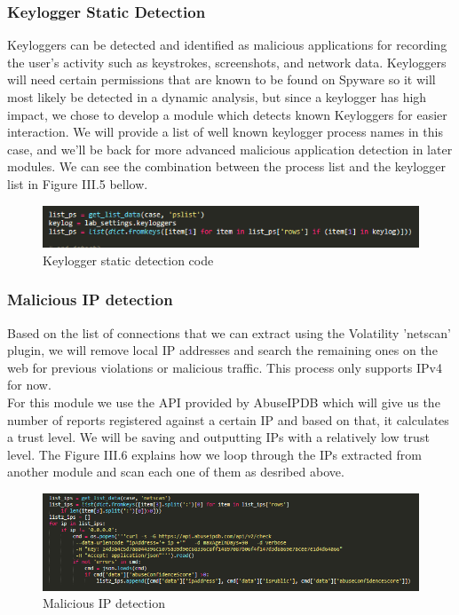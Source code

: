 \subsubsection{Keylogger Static Detection}
Keyloggers can be detected and identified as malicious applications for recording the user's activity such as keystrokes, screenshots, and network data. Keyloggers will need certain permissions that are known to be found on Spyware so it will most likely be detected in a dynamic analysis, but since a keylogger has high impact, we chose to develop a module which detects known Keyloggers for easier interaction. We will provide a list of well known keylogger process names in this case, and we'll be back for more advanced malicious application detection in later modules. We can see the combination between the process list and the keylogger list in Figure III.5 bellow.
\begin{figure}[H]
\centering
\includegraphics[width=0.8\columnwidth]{Figures/keyloggers.png}
\caption{Keylogger static detection code}
\end{figure}

\subsubsection{Malicious IP detection}
Based on the list of connections that we can extract using the Volatility 'netscan' plugin, we will remove local IP addresses and search the remaining ones on the web for previous violations or malicious traffic. This process only supports IPv4 for now.\\
For this module we use the API provided by AbuseIPDB\cite{abuseip} which will give us the number of reports registered against a certain IP and based on that, it calculates a trust level. We will be saving and outputting IPs with a relatively low trust level. The Figure III.6 explains how we loop through the IPs extracted from another module and scan each one of them as desribed above.
\begin{figure}[H]
\centering
\includegraphics[width=0.8\columnwidth]{Figures/ips.png}
\caption{Malicious IP detection}
\end{figure}

